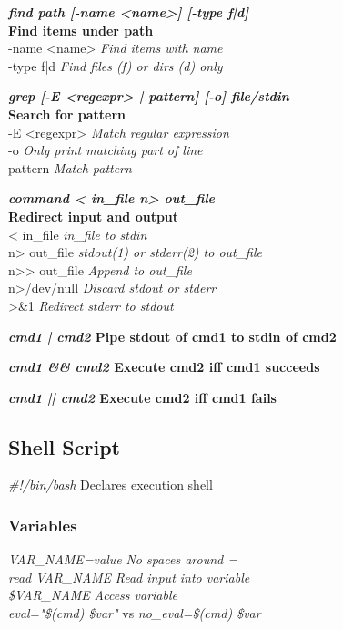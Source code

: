 \textbf{\emph{find path [-name <name>] [-type f|d]} \\\hfill Find items under path}\\
\quad -name <name> \hfill \textit{Find items with name}\\
\quad -type f|d \hfill \textit{Find files (f) or dirs (d) only}

\textbf{\emph{grep [-E <regexpr> | pattern] [-o] file/stdin} \\\hfill Search for pattern}\\
\quad -E <regexpr> \hfill \textit{Match regular expression}\\
\quad -o \hfill \textit{Only print matching part of line}\\
\quad pattern \hfill \textit{Match pattern}

\textbf{\emph{command < in\_file n> out\_file} \\\hfill Redirect input and output}\\
\quad < in\_file \hfill \textit{in\_file to stdin}\\
\quad n> out\_file \hfill \textit{stdout(1) or stderr(2) to out\_file}\\
\quad n>{}> out\_file \hfill \textit{Append to out\_file}\\
\quad n>/dev/null \hfill \textit{Discard stdout or stderr}\\
>\&1 \hfill \textit{Redirect stderr to stdout}

\textbf{\emph{cmd1 | cmd2} \hfill Pipe stdout of cmd1 to stdin of cmd2}

\textbf{\emph{cmd1 \&\& cmd2} \hfill Execute cmd2 iff cmd1 succeeds}

\textbf{\emph{cmd1 || cmd2} \hfill Execute cmd2 iff cmd1 fails}

\subsection*{Shell Script}

\emph{\#!/bin/bash} \hfill Declares execution shell

\subsubsection*{Variables}

\emph{VAR\_NAME=value} \hfill \textit{No spaces around =}\\
\emph{read VAR\_NAME} \hfill \textit{Read input into variable}\\
\emph{\$VAR\_NAME} \hfill \textit{Access variable}\\
\emph{eval="\$(cmd) \$var"} vs \emph{no\_eval=\sq \$(cmd) \$var\sq}

